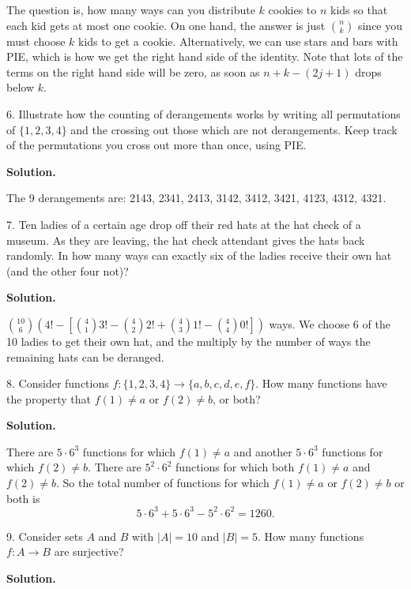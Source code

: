 \documentclass[10pt,]{book}
\theoremstyle{plain}
\theoremstyle{definition}
\theoremstyle{definition}
\theoremstyle{definition}
\numberwithin{equation}{section}
\begin{document}
\begin{exerciselist}
            The question is, how many ways can you distribute \(k\) cookies to \(n\) kids so that each kid gets at most one cookie. On one hand, the answer is just \({n \choose k}\) since you must choose \(k\) kids to get a cookie. Alternatively, we can use stars and bars with PIE, which is how we get the right hand side of the identity. Note that lots of the terms on the right hand side will be zero, as soon as \(n+k-(2j+1)\) drops below \(k\).
\item[6.]\hypertarget{exercise-97}{}
            Illustrate how the counting of derangements works by writing all permutations of \(\{1,2,3,4\}\) and the crossing out those which are not derangements. Keep track of the permutations you cross out more than once, using PIE.
\par\smallskip
\par\smallskip
\noindent\textbf{Solution.}\hypertarget{solution-148}{}\quad

            The 9 derangements are: 2143, 2341, 2413, 3142, 3412, 3421, 4123, 4312, 4321.
\item[7.]\hypertarget{exercise-98}{}
            Ten ladies of a certain age drop off their red hats at the hat check of a museum. As they are leaving, the hat check attendant gives the hats back randomly. In how many ways can exactly six of the ladies receive their own hat (and the other four not)?
\par\smallskip
\par\smallskip
\noindent\textbf{Solution.}\hypertarget{solution-149}{}\quad

            \({10 \choose 6}\left(4! - \left[{4 \choose 1} 3! - {4 \choose 2}2! + {4 \choose 3}1! - {4 \choose 4}0!\right]\right)\) ways. We choose 6 of the 10 ladies to get their own hat, and the multiply by the number of ways the remaining hats can be deranged.
\item[8.]\hypertarget{exercise-99}{}
      Consider functions \(f: \{1,2,3,4\} \to \{a,b,c,d,e,f\}\).
      How many functions have the property that \(f(1) \ne a\) or \(f(2) \ne b\), or both?
\par\smallskip
\par\smallskip
\noindent\textbf{Solution.}\hypertarget{solution-150}{}\quad

      There are \(5 \cdot 6^3\) functions for which \(f(1) \ne a\) and another \(5 \cdot 6^3\) functions for which \(f(2) \ne b\).  There are \(5^2 \cdot 6^2\) functions for which both \(f(1) \ne a\) and \(f(2) \ne b\).  So the total number of functions for which \(f(1) \ne a\) or \(f(2) \ne b\) or both is
      \begin{equation*}
        5 \cdot 6^3 + 5 \cdot 6^3 - 5^2 \cdot 6^2 = 1260.
      \end{equation*}
\item[9.]\hypertarget{exercise-100}{}
      Consider sets \(A\) and \(B\) with \(|A| = 10\) and \(|B| = 5\). How many functions \(f: A \to B\) are surjective?
\par\smallskip
\par\smallskip
\noindent\textbf{Solution.}\hypertarget{solution-151}{}\quad


\end{exerciselist}
\end{document}
